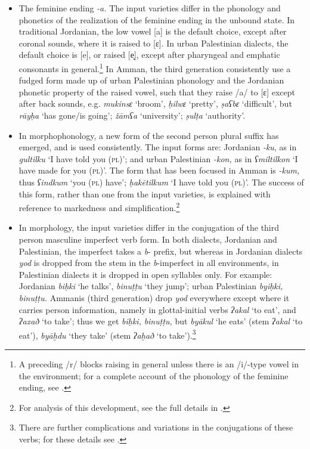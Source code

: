 \documentclass[output=paper]{langsci/langscibook}
\begin{document}
\begin{itemize}

\item[]
The feminine ending \textit{{}-a.} The input varieties differ in the phonology and phonetics of the realization of the feminine ending in the unbound state. In traditional Jordanian, the low vowel [a] is the default choice, except after coronal sounds, where it is raised to [ɛ]. In urban Palestinian dialects, the default choice is [e], or raised [e̝], except after pharyngeal and emphatic consonants in general.\footnote{A preceding /r/ blocks raising in general unless there is an /i/-type vowel in the environment; for a complete account of the phonology of the feminine ending, see \citet{Al-WerEtAl2015}.} In Amman, the third generation consistently use a fudged form made up of urban Palestinian phonology and the Jordanian phonetic property of the raised vowel, such that they raise /a/ to [ɛ] except after back sounds, e.g. \textit{mukinsɛ} ‘broom', \textit{ḥilwɛ} ‘pretty’, \textit{ṣaʕbɛ} ‘difficult’, but \textit{rāyḥa} ‘has gone/is going’; \textit{žāmʕa} ‘university’; \textit{ṣulṭa} ‘authority’.

\item[]In morphophonology, a new form of the second person plural suffix has emerged, and is used consistently. The input forms are: Jordanian \textit{{}-ku}, as in \textit{gultilku} ‘I have told you (\textsc{pl})’; and urban Palestinian \textit{{}-kon,} as in \textit{ʕmiltilkon} ‘I have made for you (\textsc{pl})’. The form that has been focused in Amman is \textit{{}-kum,} thus \textit{ʕindkum} ‘you (\textsc{pl}) have’; \textit{ḥakētilkum} ‘I have told you (\textsc{pl)}’. The success of this form, rather than one from the input varieties, is explained with reference to markedness and simplification.\footnote{For analysis of this development, see the full details in \citet{Al-Wer2003kum}.}

\item[]In morphology, the input varieties differ in the conjugation of the third person masculine imperfect verb form. In both dialects, Jordanian and Palestinian, the imperfect takes a \textit{b}{}- prefix, but whereas in Jordanian dialects \textit{yod} is dropped from the stem in the \textit{b}{}-imperfect in all environments, in Palestinian dialects it is dropped in open syllables only. For example: Jordanian \textit{biḥki} ‘he talks’, \textit{binuṭṭu} ‘they jump’; urban Palestinian \textit{byiḥki,} \textit{binuṭṭu.} Ammanis (third generation) drop \textit{yod} everywhere except where it carries person information, namely in glottal-initial verbs \textit{ʔakal} ‘to eat’, and \textit{ʔaxað} ‘to take’; thus we get \textit{biḥki,} \textit{binuṭṭu,} but \textit{byākul} ‘he eats’ (stem \textit{ʔakal} ‘to eat’), \textit{byāḫdu} ‘they take’ (stem \textit{ʔaḫað} ‘to take’).\footnote{There are further complications and variations in the conjugations of these verbs; for these details see \citet{Al-Wer2014}.}
\end{itemize}
\end{document}
